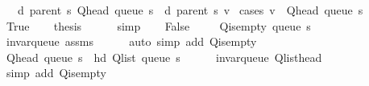 \begin{isabellebody}
\ \ \ {\isachardoublequoteopen}d\ {\isacharparenleft}{\kern0pt}parent\ s{\isacharparenright}{\kern0pt}\ {\isacharparenleft}{\kern0pt}Q{\isacharunderscore}{\kern0pt}head\ {\isacharparenleft}{\kern0pt}queue\ s{\isacharparenright}{\kern0pt}{\isacharparenright}{\kern0pt}\ {\isasymle}\ d\ {\isacharparenleft}{\kern0pt}parent\ s{\isacharparenright}{\kern0pt}\ v{\isachardoublequoteclose}%
\endisataginvisible
{\isafoldinvisible}%
%
\isadeliminvisible
\isanewline
%
\endisadeliminvisible
%
\isadelimproof
%
\endisadelimproof
%
\isatagproof
{}\isamarkupfalse%
\ {\isacharparenleft}{\kern0pt}cases\ {\isachardoublequoteopen}v\ {\isacharequal}{\kern0pt}\ Q{\isacharunderscore}{\kern0pt}head\ {\isacharparenleft}{\kern0pt}queue\ s{\isacharparenright}{\kern0pt}{\isachardoublequoteclose}{\isacharparenright}{\kern0pt}\isanewline
\ \ \isamarkupfalse%
\ True\isanewline
\ \ \isamarkupfalse%
\ {\isacharquery}{\kern0pt}thesis\isanewline
\ \ \ \ \isamarkupfalse%
\ simp\isanewline
{}\isamarkupfalse%
\isanewline
\ \ \isamarkupfalse%
\ False\isanewline
\ \ \isamarkupfalse%
\ {\isachardoublequoteopen}{\isasymnot}\ Q{\isacharunderscore}{\kern0pt}is{\isacharunderscore}{\kern0pt}empty\ {\isacharparenleft}{\kern0pt}queue\ s{\isacharparenright}{\kern0pt}{\isachardoublequoteclose}\isanewline
\ \ \ \ \isamarkupfalse%
\ invar{\isacharunderscore}{\kern0pt}queue\ assms\isanewline
\ \ \ \ \isamarkupfalse%
\ {\isacharparenleft}{\kern0pt}auto\ simp\ add{\isacharcolon}{\kern0pt}\ Q{\isachardot}{\kern0pt}is{\isacharunderscore}{\kern0pt}empty{\isacharparenright}{\kern0pt}\isanewline
\ \ \isamarkupfalse%
\ \isamarkupfalse%
\ {\isachardoublequoteopen}Q{\isacharunderscore}{\kern0pt}head\ {\isacharparenleft}{\kern0pt}queue\ s{\isacharparenright}{\kern0pt}\ {\isacharequal}{\kern0pt}\ hd\ {\isacharparenleft}{\kern0pt}Q{\isacharunderscore}{\kern0pt}list\ {\isacharparenleft}{\kern0pt}queue\ s{\isacharparenright}{\kern0pt}{\isacharparenright}{\kern0pt}{\isachardoublequoteclose}\isanewline
\ \ \ \ \isamarkupfalse%
\ invar{\isacharunderscore}{\kern0pt}queue\ Q{\isachardot}{\kern0pt}list{\isacharunderscore}{\kern0pt}head\isanewline
\ \ \ \ \isamarkupfalse%
\ {\isacharparenleft}{\kern0pt}simp\ add{\isacharcolon}{\kern0pt}\ Q{\isachardot}{\kern0pt}is{\isacharunderscore}{\kern0pt}empty{\isacharparenright}{\kern0pt}\isanewline
\ \ \isamarkupfalse%
\ \isamarkupfalse%

\end{isabellebody}
